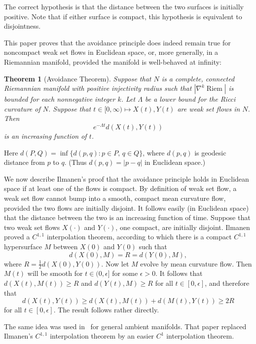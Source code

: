 \documentclass{amsart}
\newcommand{\Riem}{\operatorname{Riem}}
\newcommand{\eps}{\epsilon}
\newtheorem{theorem}    {Theorem}   %
\theoremstyle{definition}
\theoremstyle{definition}
\begin{document}
The correct hypothesis is that the distance between the two surfaces is initially positive.
Note that if either surface is compact, this hypothesis is equivalent to disjointness. 

This paper proves that the avoidance principle does indeed remain true for noncompact
weak set flows in Euclidean space, or, more generally, in a Riemannian manifold, provided the manifold
is well-behaved at infinity:


\begin{theorem}[Avoidance Theorem]
Suppose that $N$ is a complete, connected Riemannian manifold
with positive injectivity radius  such that $|\nabla^k \Riem|$ is bounded  for each nonnegative
 integer $k$.
Let $\Lambda$ be a lower bound for the Ricci curvature of $N$.
Suppose that $t\in [0,\infty)\mapsto X(t), Y(t)$ are weak set flows in $N$.
Then
\[
   e^{-\Lambda t} d(X(t),Y(t)) 
\]
is an increasing function of $t$.
\end{theorem}

Here $d(P,Q)= \inf \{d(p,q): p\in P,\, q\in Q\}$, where $d(p,q)$ is geodesic distance
from $p$ to $q$. (Thus $d(p,q)=|p-q|$ in Euclidean space.)

We now describe Ilmanen's proof that the avoidance principle holds
in Euclidean space if at least one of the
flows is compact.  By definition of weak set flow, a weak set flow
cannot bump into a smooth, compact mean curvature flow, provided the two flows are initially disjoint.
  It follows easily (in Euclidean space) 
 that the distance between the two is an increasing
function of time.  Suppose that 
 two weak set flows $X(\cdot)$ and $Y(\cdot)$,
one compact, are initially disjoint.  
Ilmanen proved a $C^{1,1}$ interpolation theorem, according to which there is a compact $C^{1,1}$ hypersurface $M$
between $X(0)$ and $Y(0)$ such that 
\begin{equation}\label{distant}
d(X(0),M)=R=d(Y(0),M), 
\end{equation}
where $R=\frac12 d(X(0),Y(0))$.
Now let $M$ evolve by mean curvature flow.  Then $M(t)$ will be smooth for $t\in (0,\eps]$
for some $\eps>0$.   It follows that $d(X(t),M(t))\ge R$ and $d(Y(t),M)\ge R$
for all $t\in [0,\eps]$, and therefore that 
\[
   d(X(t),Y(t)) \ge d(X(t),M(t)) + d(M(t),Y(t)) \ge 2R
\]
for all $t\in [0,\eps]$.  The result follows rather directly.

The same idea was used in~\cite{hershkovits-w-avoid} for general ambient manifolds.
That paper replaced Ilmanen's $C^{1,1}$ interpolation theorem by an easier
$C^1$ interpolation theorem.
\end{document}
